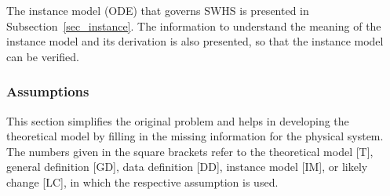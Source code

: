 \documentclass[12pt]{article}
\newcommand{\progname}{SWHS}
\begin{document}
The instance model (ODE) that governs \progname{} is presented in
Subsection~\ref{sec_instance}.  The information to understand the meaning of the
instance model and its derivation is also presented, so that the instance
model can be verified.

\subsubsection{Assumptions}

This section simplifies the original problem and helps in developing the
theoretical model by filling in the missing information for the physical
system. The numbers given in the square brackets refer to the theoretical model
[T], general definition [GD], data definition [DD], instance model [IM], or
likely change [LC], in which the respective assumption is used.
\end{document}
